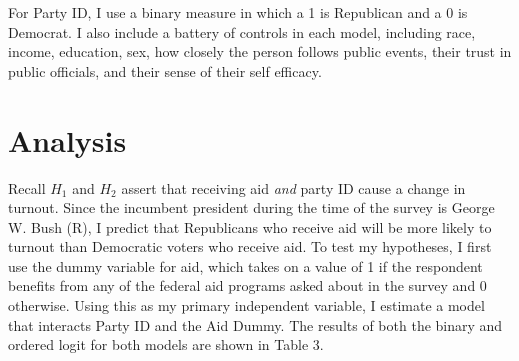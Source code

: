 \documentclass[12pt]{paper}
\begin{document}
For Party ID, I use a binary measure in which a 1 is Republican and a 0 is Democrat. I also include a battery of controls in each model, including race, income, education, sex, how closely the person follows public events, their trust in public officials, and their sense of their self efficacy.

\section{Analysis}

Recall $H_1$ and $H_2$ assert that receiving aid \textit{and} party ID cause a change in turnout. Since the incumbent president during the time of the survey is George W. Bush (R), I predict that Republicans who receive aid will be more likely to turnout than Democratic voters who receive aid. To test my hypotheses, I first use the dummy variable for aid, which takes on a value of 1 if the respondent benefits from any of the federal aid programs asked about in the survey and 0 otherwise. Using this as my primary independent variable, I estimate a model that interacts Party ID and the Aid Dummy. The results of both the binary and ordered logit for both models are shown in Table 3.
\end{document}
